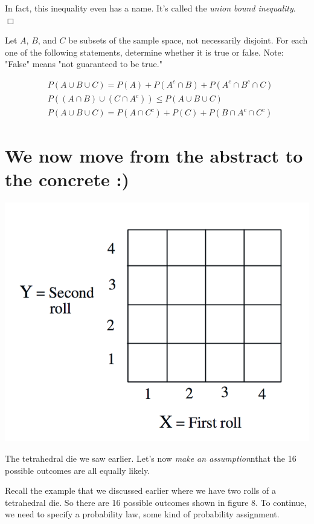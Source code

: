 \documentclass{tufte-handout}
\begin{document}
In fact, this inequality even has a name. It's called the \textit{union bound inequality}. $\Box$


Let $A$, $B$, and $C$ be subsets of the sample space, not necessarily disjoint. For each one of the following statements, determine whether it is true or false. Note: "False" means "not guaranteed to be true."

\setcounter{equation}{0}
\begin{align}
&P(A \cup B \cup C)  = P(A) + P(A^c \cap B) + P (A^c \cap B^c \cap C) \\
&P((A \cap B) \cup (C \cap A^c)) \leq P(A \cup B \cup C) \\
&P(A \cup B \cup C) = P(A \cap C^c) + P(C) + P(B \cap A^c \cap C^c)
\end{align}




\pagebreak
\section{We now move from the abstract to the concrete :)}\label{sec:model-building}

\begin{marginfigure}
  \includegraphics{TetraDie}
  \caption{The tetrahedral die we saw earlier. Let's now \textit{make an assumption}nthat the 16 possible outcomes are all
equally likely.}
\end{marginfigure}

Recall the example that we discussed earlier where
we have two rolls of a tetrahedral die. So there are 16 possible outcomes shown in figure 8. To
continue, we need to specify a probability law, some kind of probability assignment.
\end{document}

